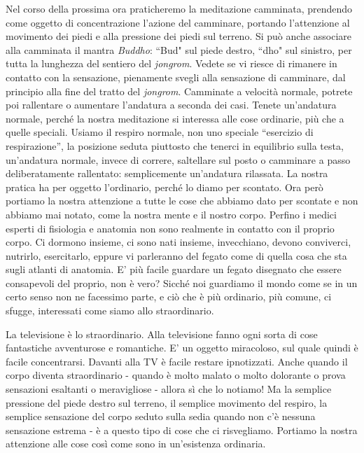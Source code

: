 
Nel corso della prossima ora praticheremo la meditazione camminata,
prendendo come oggetto di concentrazione l'azione del camminare,
portando l'attenzione al movimento dei piedi e alla pressione dei piedi
sul terreno. Si può anche associare alla camminata il mantra \textit{Buddho}:
“Bud" sul piede destro, “dho" sul sinistro, per tutta la lunghezza del
sentiero del \textit{jongrom}. Vedete se vi riesce di rimanere in contatto con la
sensazione, pienamente svegli alla sensazione di camminare, dal
principio alla fine del tratto del \textit{jongrom}. Camminate a velocità
normale, potrete poi rallentare o aumentare l'andatura a seconda dei
casi. Tenete un'andatura normale, perché la nostra meditazione si
interessa alle cose ordinarie, più che a quelle speciali. Usiamo il
respiro normale, non uno speciale “esercizio di respirazione”, la
posizione seduta piuttosto che tenerci in equilibrio sulla testa,
un'andatura normale, invece di correre, saltellare sul posto o camminare
a passo deliberatamente rallentato: semplicemente un'andatura rilassata.
La nostra pratica ha per oggetto l'ordinario, perché lo diamo per
scontato. Ora però portiamo la nostra attenzione a tutte le cose che
abbiamo dato per scontate e non abbiamo mai notato, come la nostra mente
e il nostro corpo. Perfino i medici esperti di fisiologia e anatomia non
sono realmente in contatto con il proprio corpo. Ci dormono insieme, ci
sono nati insieme, invecchiano, devono conviverci, nutrirlo,
esercitarlo, eppure vi parleranno del fegato come di quella cosa che sta
sugli atlanti di anatomia. E' più facile guardare un fegato disegnato
che essere consapevoli del proprio, non è vero? Sicché noi guardiamo il
mondo come se in un certo senso non ne facessimo parte, e ciò che è più
ordinario, più comune, ci sfugge, interessati come siamo allo
straordinario.

La televisione è lo straordinario. Alla televisione fanno ogni sorta di
cose fantastiche avventurose e romantiche. E' un oggetto miracoloso, sul
quale quindi è facile concentrarsi. Davanti alla TV è facile restare
ipnotizzati. Anche quando il corpo diventa straordinario - quando è
molto malato o molto dolorante o prova sensazioni esaltanti o
meravigliose - allora sì che lo notiamo! Ma la semplice pressione del
piede destro sul terreno, il semplice movimento del respiro, la semplice
sensazione del corpo seduto sulla sedia quando non c'è nessuna
sensazione estrema - è a questo tipo di cose che ci risvegliamo.
Portiamo la nostra attenzione alle cose così come sono in un'esistenza
ordinaria.

